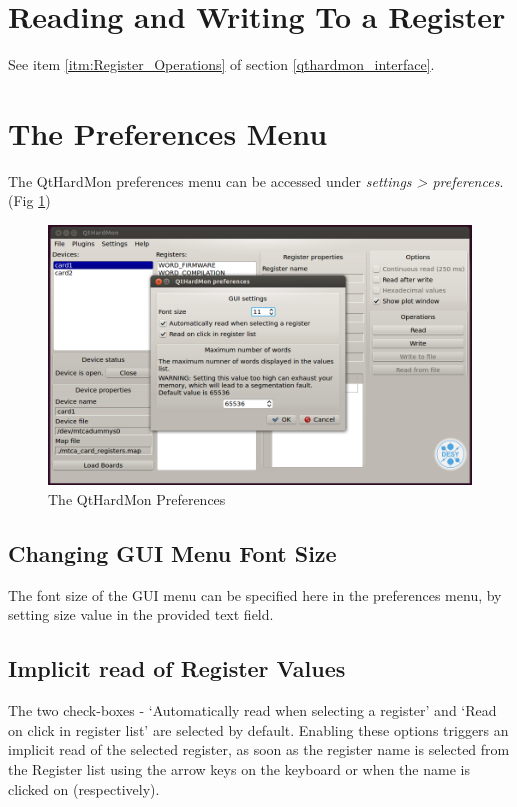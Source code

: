 \begin{enumerate}
\end{enumerate}

\section{Reading and Writing To a Register}
See item \ref{itm:Register_Operations} of section \ref{qthardmon_interface}.

\section{The Preferences Menu}\label{preference_section}
The QtHardMon preferences menu can be accessed under \textit{settings > preferences}. (Fig \ref{qthardmon_preferences})

\begin{figure}[htbp]
\centering
\includegraphics[width=1\textwidth]{images/preferences.png}
 \caption{The QtHardMon Preferences}
\label{qthardmon_preferences}			
\end{figure}

\subsection{Changing GUI Menu Font Size}
The font size of the GUI menu can be specified here in the preferences menu, by setting size value in the provided text field.

\subsection{Implicit read of Register Values}\label{sub::imp_read}
The two check-boxes - `Automatically read when selecting a register' and `Read on click in register list' are selected by default. Enabling these options triggers an implicit read of the selected register, as soon as the register name is selected from the Register list using the arrow keys on the keyboard or when the name is clicked on (respectively).

